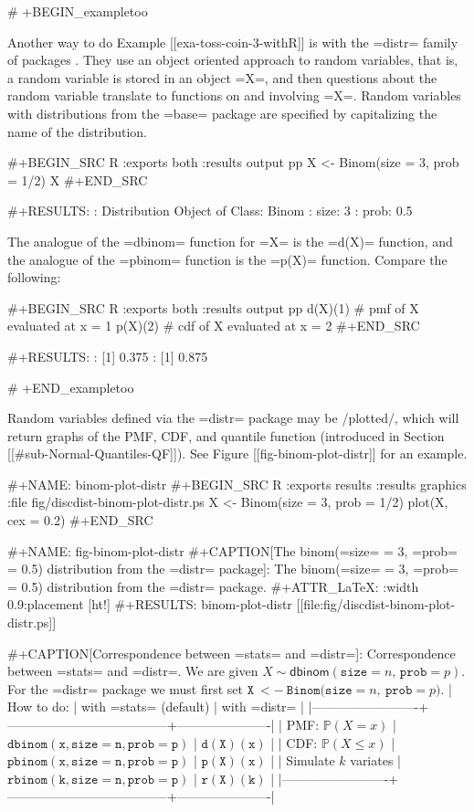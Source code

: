 # +BEGIN_exampletoo

Another way to do Example [[exa-toss-coin-3-withR]] is with the =distr=
family of packages \cite{distr}. They use an object oriented approach
to random variables, that is, a random variable is stored in an object
=X=, and then questions about the random variable translate to
functions on and involving =X=. Random variables with distributions
from the =base= package\cite{base} are specified by capitalizing the
name of the distribution.

#+BEGIN_SRC R :exports both :results output pp  
X <- Binom(size = 3, prob = 1/2)
X
#+END_SRC

#+RESULTS:
: Distribution Object of Class: Binom
:  size: 3
:  prob: 0.5

The analogue of the =dbinom= function for =X= is the =d(X)= function,
and the analogue of the =pbinom= function is the =p(X)=
function. Compare the following:

#+BEGIN_SRC R :exports both :results output pp  
d(X)(1)   # pmf of X evaluated at x = 1
p(X)(2)   # cdf of X evaluated at x = 2
#+END_SRC

#+RESULTS:
: [1] 0.375
: [1] 0.875

# +END_exampletoo


Random variables defined via the =distr= package \cite{distr} may be
/plotted/, which will return graphs of the PMF, CDF, and quantile
function (introduced in Section [[#sub-Normal-Quantiles-QF]]). See
Figure [[fig-binom-plot-distr]] for an example.

#+NAME: binom-plot-distr
#+BEGIN_SRC R :exports results :results graphics :file fig/discdist-binom-plot-distr.ps
X <- Binom(size = 3, prob = 1/2)
plot(X, cex = 0.2)
#+END_SRC

#+NAME: fig-binom-plot-distr
#+CAPTION[The \textsf{binom}(=size= = 3, =prob= = 0.5) distribution from the =distr= package]: \small The \textsf{binom}(=size= = 3, =prob= = 0.5) distribution from the =distr= package.
#+ATTR_LaTeX: :width 0.9\textwidth :placement [ht!]
#+RESULTS: binom-plot-distr
[[file:fig/discdist-binom-plot-distr.ps]]


#+CAPTION[Correspondence between =stats= and =distr=]: Correspondence between =stats= and =distr=. We are given \(X\sim\mathsf{dbinom}(\mathtt{size}=n,\,\mathtt{prob}=p)\).  For the =distr= package we must first set \(\mathtt{X\ <-\ Binom(size=}n\mathtt{,\ prob=}p\mathtt{)}\).
| How to do:              | with =stats= (default)               | with =distr=         |
|-------------------------+--------------------------------------+----------------------|
| PMF: \(\mathbb{P}(X=x)\)       | \(\mathtt{dbinom(x,size=n,prob=p)}\) | \(\mathtt{d(X)(x)}\) |
| CDF:  \(\mathbb{P}(X\leq x)\)  | \(\mathtt{pbinom(x,size=n,prob=p)}\) | \(\mathtt{p(X)(x)}\) |
| Simulate \(k\) variates | \(\mathtt{rbinom(k,size=n,prob=p)}\) | \(\mathtt{r(X)(k)}\) |
|-------------------------+--------------------------------------+----------------------|


